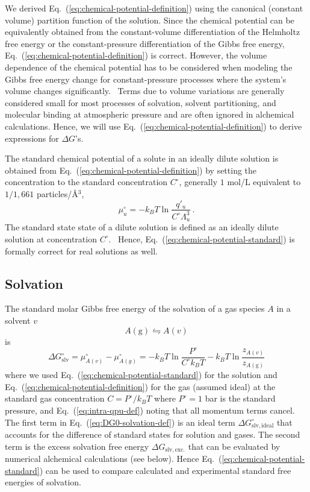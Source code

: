 \documentclass[9pt,bestpractices,pubversion]{livecoms}
\begin{document}
We derived Eq.~(\ref{eq:chemical-potential-definition}) using the canonical (constant volume) partition function of the solution. Since the chemical potential can be equivalently obtained from the constant-volume differentiation of the Helmholtz free energy or the constant-pressure differentiation of the Gibbs free energy, Eq.~(\ref{eq:chemical-potential-definition}) is correct. However, the volume dependence of the chemical potential has to be considered when modeling the Gibbs free energy change for constant-pressure processes where the system's volume changes significantly.~\cite{gilson1997statisticalthermodynamic} Terms due to volume variations are generally considered small for most processes of solvation, solvent partitioning, and molecular binding at atmospheric pressure and are often ignored in alchemical calculations. Hence, we will use Eq.~(\ref{eq:chemical-potential-definition}) to derive expressions for $\Delta G$'s.

The standard chemical potential of a solute in an ideally dilute solution is obtained from Eq.~(\ref{eq:chemical-potential-definition}) by setting the concentration to the standard concentration $C^\circ$, generally $1$ mol/L equivalent to $1/1,661$ particles/\AA$^{3}$, 
\begin{equation}
  \mu_u^\circ = -k_B T \ln \frac{q'_u}{C^\circ \Lambda_u^3} \, .
  \label{eq:chemical-potential-standard}
\end{equation}
The standard state state of a dilute solution is defined as an ideally dilute solution at concentration $C^\circ$.~\cite{levine2009physicalchemistrybook6ed} Hence, Eq.~(\ref{eq:chemical-potential-standard}) is formally correct for real solutions as well.

\subsection{Solvation}


The standard molar Gibbs free energy of the solvation of a gas species $A$ in a solvent $v$
\begin{equation}
A(\mathrm{g})  \leftrightharpoons A(v)
\end{equation}
is
\begin{equation}
  \Delta G^\circ_{\mathrm{slv}} = \mu^\circ_{A(v)}  - \mu^\circ_{A(g)} = -k_B T \ln \frac{P^\circ}{C^\circ k_B T} - k_B T \ln \frac{z_{A(v)}}{z_{A(\mathrm{g})}}
  \label{eq:DG0-solvation-def}
\end{equation}
where we used Eq.~(\ref{eq:chemical-potential-standard}) for the solution and  Eq.~(\ref{eq:chemical-potential-definition}) for the gas (assumed ideal) at the standard gas concentration $C = P^\circ/k_B T$ where $P^\circ = 1$ bar is the standard pressure, and Eq.~(\ref{eq:intra-qpu-def}) noting that all momentum terms cancel. The first term in Eq.~(\ref{eq:DG0-solvation-def}) is an ideal term $\Delta G^\circ_{\mathrm{slv,ideal}}$ that accounts for the difference of standard states for solution and gases. The second term is the excess solvation free energy $\Delta G_{\mathrm{slv, exc.}}$ that can be evaluated by numerical alchemical calculations (see below). Hence Eq.~(\ref{eq:chemical-potential-standard}) can be used to compare calculated and experimental standard free energies of solvation.
\end{document}
